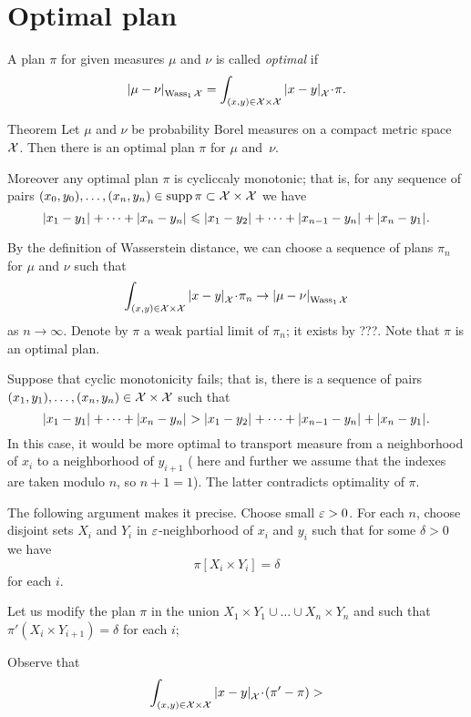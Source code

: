 \section{Optimal plan}

A plan $\pi$ for given measures $\mu$ and $\nu$ is called \emph{optimal} if 
\[\dist{\mu}{\nu}{\Wass_1\spc{X}}
=\int_{(x,y)\in\spc{X}\times\spc{X}}\dist{x}{y}{\spc{X}}\cdot\pi.\]

\begin{thm}{Theorem}
Let $\mu$ and $\nu$ be probability Borel measures on a compact metric space $\mathcal{X}$.
Then there is an optimal plan $\pi$ for $\mu$ and~$\nu$.

Moreover any optimal plan $\pi$ is cycliccaly monotonic;
that is, for any sequence of pairs $(x_0,y_0),\dots,(x_n,y_n)\in\operatorname{\rm supp}\nolimits\pi\subset\mathcal{X}\times\mathcal{X}$ we have
\[\dist{x_1}{y_1}{}+\dots+\dist{x_n}{y_n}{}
\le
\dist{x_1}{y_2}{}+\dots+\dist{x_{n-1}}{y_n}{}+\dist{x_{n}}{y_1}{}.\]
\end{thm}

By the definition of Wasserstein distance, we can choose a sequence of plans $\pi_n$ for $\mu$ and $\nu$ such that 
\[\int_{(x,y)\in\spc{X}\times\spc{X}}\dist{x}{y}{\spc{X}}\cdot\pi_n\to \dist{\mu}{\nu}{\Wass_1\spc{X}}\]
as $n\to \infty$.
Denote by $\pi$ a weak partial limit of $\pi_n$;
it exists by ???.
Note that $\pi$ is an optimal plan.

Suppose that cyclic monotonicity fails;
that is, there is a sequence of pairs $(x_1,y_1),\dots,(x_n,y_n)\in\mathcal{X}\times\mathcal{X}$ such that
\[\dist{x_1}{y_1}{}+\dots+\dist{x_n}{y_n}{}
>
\dist{x_1}{y_2}{}+\dots+\dist{x_{n-1}}{y_n}{}+\dist{x_{n}}{y_1}{}.\]
In this case, it would be more optimal to transport measure from a neighborhood of $x_i$ to a neighborhood of $y_{i+1}$ (
here and further we assume that the indexes are taken modulo $n$, so $n+1=1$).
The latter contradicts optimality of $\pi$.

The following argument makes it precise.
Choose small $\varepsilon>0$.
For each $n$,
choose disjoint sets $X_i$ and $Y_i$ in $\varepsilon$-neighborhood of $x_i$ and $y_i$
such that for some $\delta>0$ we have 
\[\pi [X_i\times Y_i]=\delta\]
for each $i$.

Let us modify the plan $\pi$ in the union $X_1\times Y_1 \cup\dots\cup X_n\times Y_n$ and such that 
$\pi'(X_i\times Y_{i+1})=\delta$ for each $i$;


Observe that
\[\int_{(x,y)\in\spc{X}\times\spc{X}}\dist{x}{y}{\spc{X}}\cdot(\pi'-\pi)>\]
\qeds


